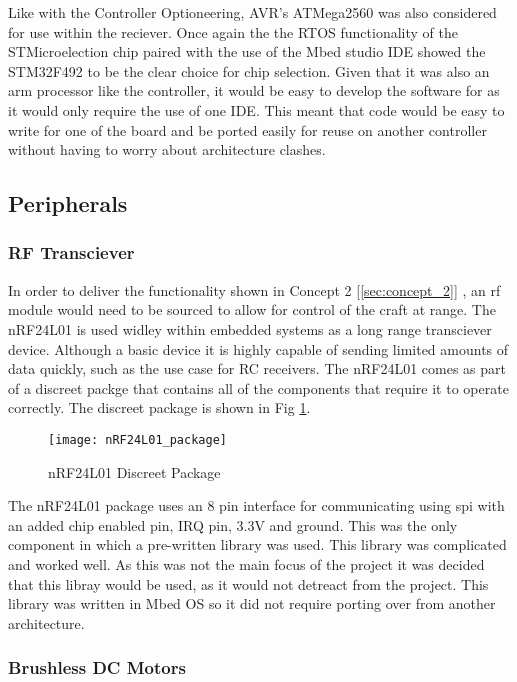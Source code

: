 \documentclass [11pt]{article}
\begin{document}
Like with the Controller Optioneering, AVR's ATMega2560 was also considered for use within the reciever. Once again the the RTOS functionality of the STMicroelection  chip paired with the use of the Mbed studio IDE showed the STM32F492 to be the clear choice for chip selection. Given that it was also an \gls{arm} processor like the controller, it would be easy to develop the software for as it would only require the use of one IDE. This meant that code would be easy to write for one of the board and be ported easily for reuse on another controller without having to worry about architecture clashes.       

\subsection{Peripherals}
\subsubsection{RF Transciever}

In order to deliver the functionality shown in Concept 2 [\ref{sec:concept_2}] , an \gls{rf} module would need to be sourced to allow for control of the craft at range. The nRF24L01 is used widley within embedded systems as a long range transciever device. Although a basic device it is highly capable of sending limited amounts of data quickly, such as the use case for RC receivers. The nRF24L01 comes as part of a discreet packge that contains all of the components that require it to operate correctly. The discreet package is shown in Fig \ref{fig:nRF24L01_package}.

\begin{figure}[H]
\centerline{\texttt{[image: nRF24L01\_package]}}
\caption{nRF24L01 Discreet Package}
\label{fig:nRF24L01_package}
\end{figure}

The nRF24L01 package uses an 8 pin interface for communicating using \gls{spi} with an added chip enabled pin, IRQ pin, 3.3V and ground. This was the only component in which a pre-written library was used. This library was complicated and worked well. As this was not the main focus of the project it was decided that this libray would be used, as it would not detreact from the project. This library was written in Mbed OS so it did not require porting over from another architecture.  

\subsubsection{Brushless DC Motors}
\end{document}

